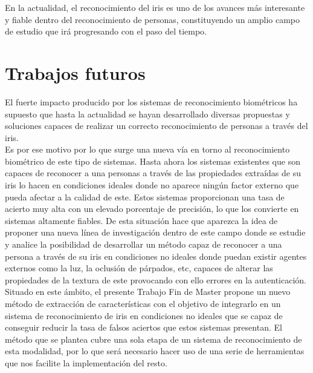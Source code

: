 En la actualidad, el reconocimiento del iris es uno de los avances más interesante y fiable dentro del reconocimiento de personas, constituyendo un amplio campo de estudio que irá progresando con el paso del tiempo. \\



\section{Trabajos futuros}

El fuerte impacto producido por los sistemas de reconocimiento biométricos ha supuesto que hasta la actualidad se hayan desarrollado diversas propuestas y soluciones capaces de realizar un correcto reconocimiento de personas a través del iris.\\

Es por ese motivo por lo que surge una nueva vía en torno al reconocimiento biométrico de este tipo de sistemas. Hasta ahora los sistemas existentes que son capaces de reconocer a una personas a través de las propiedades extraídas de su iris lo hacen en condiciones ideales donde no aparece ningún factor externo que pueda afectar a la calidad de este. Estos sistemas proporcionan una tasa de acierto muy alta con un elevado porcentaje de precisión, lo que los convierte en sistemas altamente fiables. De esta situación hace que aparezca la idea de proponer una nueva línea de investigación dentro de este campo donde se estudie y analice la posibilidad de desarrollar un método capaz de reconocer a una persona a través de su iris en condiciones no ideales donde puedan existir agentes externos como la luz, la oclusión de párpados, etc, capaces de alterar las propiedades de la textura de este provocando con ello errores en la autenticación.  \\

Situado en este ámbito, el presente Trabajo Fin de Master propone un nuevo método de extracción de características con el objetivo de integrarlo en un sistema de reconocimiento de iris en condiciones no ideales que se capaz de conseguir reducir la tasa de falsos aciertos que estos sistemas presentan. El método que se plantea cubre una sola etapa de un sistema de reconocimiento de esta modalidad, por lo que será necesario hacer uso de una serie de herramientas que nos facilite la implementación del resto. \\

